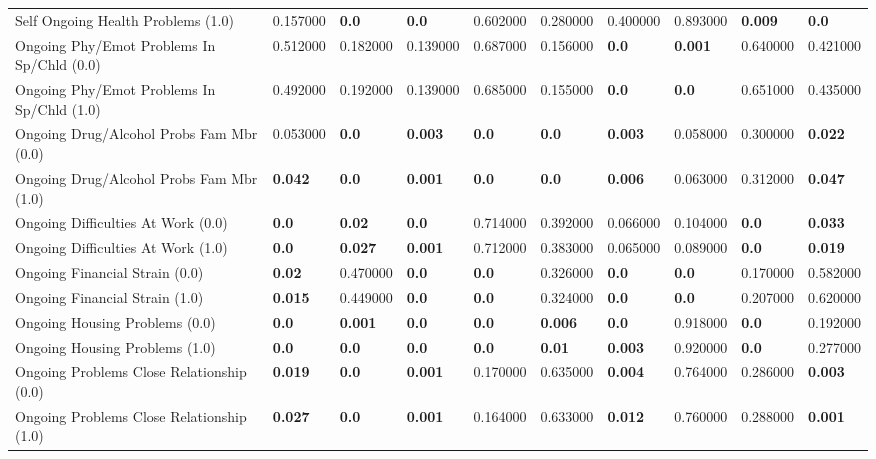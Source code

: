 \begin{tabular}{llllllllll}
Self Ongoing Health Problems (1.0) & 0.157000 & \textbf{0.0} & \textbf{0.0} & 0.602000 & 0.280000 & 0.400000 & 0.893000 & \textbf{0.009} & \textbf{0.0} \\
Ongoing Phy/Emot Problems In Sp/Chld (0.0) & 0.512000 & 0.182000 & 0.139000 & 0.687000 & 0.156000 & \textbf{0.0} & \textbf{0.001} & 0.640000 & 0.421000 \\
Ongoing Phy/Emot Problems In Sp/Chld (1.0) & 0.492000 & 0.192000 & 0.139000 & 0.685000 & 0.155000 & \textbf{0.0} & \textbf{0.0} & 0.651000 & 0.435000 \\
Ongoing Drug/Alcohol Probs Fam Mbr (0.0) & 0.053000 & \textbf{0.0} & \textbf{0.003} & \textbf{0.0} & \textbf{0.0} & \textbf{0.003} & 0.058000 & 0.300000 & \textbf{0.022} \\
Ongoing Drug/Alcohol Probs Fam Mbr (1.0) & \textbf{0.042} & \textbf{0.0} & \textbf{0.001} & \textbf{0.0} & \textbf{0.0} & \textbf{0.006} & 0.063000 & 0.312000 & \textbf{0.047} \\
Ongoing Difficulties At Work (0.0) & \textbf{0.0} & \textbf{0.02} & \textbf{0.0} & 0.714000 & 0.392000 & 0.066000 & 0.104000 & \textbf{0.0} & \textbf{0.033} \\
Ongoing Difficulties At Work (1.0) & \textbf{0.0} & \textbf{0.027} & \textbf{0.001} & 0.712000 & 0.383000 & 0.065000 & 0.089000 & \textbf{0.0} & \textbf{0.019} \\
Ongoing Financial Strain (0.0) & \textbf{0.02} & 0.470000 & \textbf{0.0} & \textbf{0.0} & 0.326000 & \textbf{0.0} & \textbf{0.0} & 0.170000 & 0.582000 \\
Ongoing Financial Strain (1.0) & \textbf{0.015} & 0.449000 & \textbf{0.0} & \textbf{0.0} & 0.324000 & \textbf{0.0} & \textbf{0.0} & 0.207000 & 0.620000 \\
Ongoing Housing Problems (0.0) & \textbf{0.0} & \textbf{0.001} & \textbf{0.0} & \textbf{0.0} & \textbf{0.006} & \textbf{0.0} & 0.918000 & \textbf{0.0} & 0.192000 \\
Ongoing Housing Problems (1.0) & \textbf{0.0} & \textbf{0.0} & \textbf{0.0} & \textbf{0.0} & \textbf{0.01} & \textbf{0.003} & 0.920000 & \textbf{0.0} & 0.277000 \\
Ongoing Problems Close Relationship (0.0) & \textbf{0.019} & \textbf{0.0} & \textbf{0.001} & 0.170000 & 0.635000 & \textbf{0.004} & 0.764000 & 0.286000 & \textbf{0.003} \\
Ongoing Problems Close Relationship (1.0) & \textbf{0.027} & \textbf{0.0} & \textbf{0.001} & 0.164000 & 0.633000 & \textbf{0.012} & 0.760000 & 0.288000 & \textbf{0.001} \\

\end{tabular}
